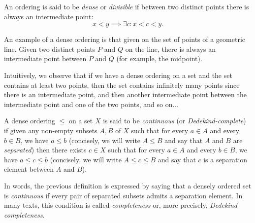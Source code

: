 \begin{definition}
  \label{def:ordinamento_denso}%
  An ordering is said to be
  \emph{dense}%
%
 or \emph{divisible} 
  if between two distinct points there is always an intermediate point:
  \[
   x < y \implies \exists c \colon x < c < y.
  \]
\end{definition}

\begin{example}
An example of a dense ordering is that given on the set of points of a geometric
line. Given two distinct points $P$ and $Q$ on the line, there is always an
intermediate point between $P$ and $Q$ (for example, the midpoint).

Intuitively, we observe that if we have a dense ordering on a set and the set
contains at least two points, then the set contains infinitely many points since
there is an intermediate point, and then another intermediate point between the
intermediate point and one of the two points, and so on...
\end{example}

\begin{definition}
  \label{def:ordinamento_continuo}%
  A dense ordering $\le$ on a set $X$ is said to be
  \emph{continuous}%
%
  (or \emph{Dedekind-complete})
  if given any non-empty subsets $A,B$ of $X$
    such that for every $a\in A$ and every $b\in B$, we have $a\le b$
    (concisely, we will write $A\le B$ and say that $A$ and $B$ are 
    \emph{separated})
    then there exists $c\in X$ such that for every $a\in A$ and every $b\in B$, 
    we have $a\le c \le b$ (concisely, we will write $A\le c \le B$
    and say that $c$ is a separation element between $A$ and $B$).
\end{definition}

In words, the previous definition is expressed by saying that a densely ordered
set is \emph{continuous} if every pair of separated subsets admits a separation
element. In many texts, this condition is called \emph{completeness} or, more
precisely, \emph{Dedekind completeness}.
%
%

